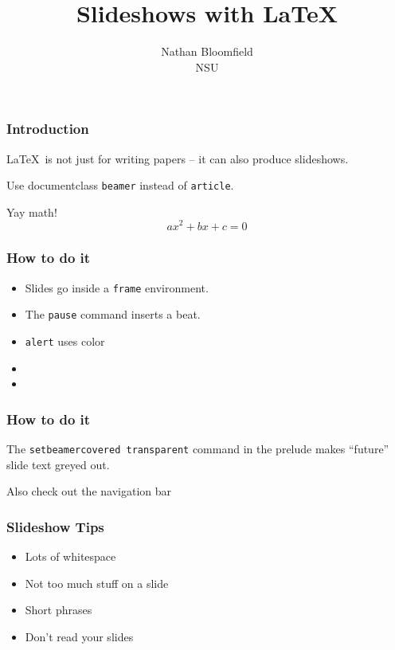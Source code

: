\documentclass{beamer}
\title[]{Slideshows with \LaTeX}
\author[]{Nathan Bloomfield \\ \footnotesize{NSU}}
\begin{document}
\begin{frame}
\titlepage
\end{frame}



\begin{frame}
\frametitle{Introduction}

\LaTeX\ is not just for writing papers -- it can also produce slideshows. \vspace{1cm}

\pause

Use documentclass \texttt{beamer} instead of \texttt{article}. \vspace{1cm}

\pause

Yay math! \[ ax^2 + bx + c = 0 \]
\end{frame}



\begin{frame}
\frametitle{How to do it}

\begin{itemize}
\item Slides go inside a \texttt{frame} environment. \pause
\item The \texttt{pause} command inserts a beat. \pause
\item \alert{\texttt{alert}} uses color \pause
\item {} \pause
\item {}
\end{itemize}
\end{frame}



\begin{frame}
\frametitle{How to do it}
The \texttt{setbeamercovered transparent} command in the prelude makes ``future'' slide text greyed out. \vspace{1cm}

\pause

Also check out the navigation bar
\end{frame}



\begin{frame}
\frametitle{Slideshow Tips}
\begin{itemize}
\item Lots of whitespace \vspace{0.5cm}
\item Not too much stuff on a slide \vspace{0.5cm}
\item Short phrases \vspace{0.5cm}
\item Don't read your slides
\end{itemize}
\end{frame}
\end{document}
